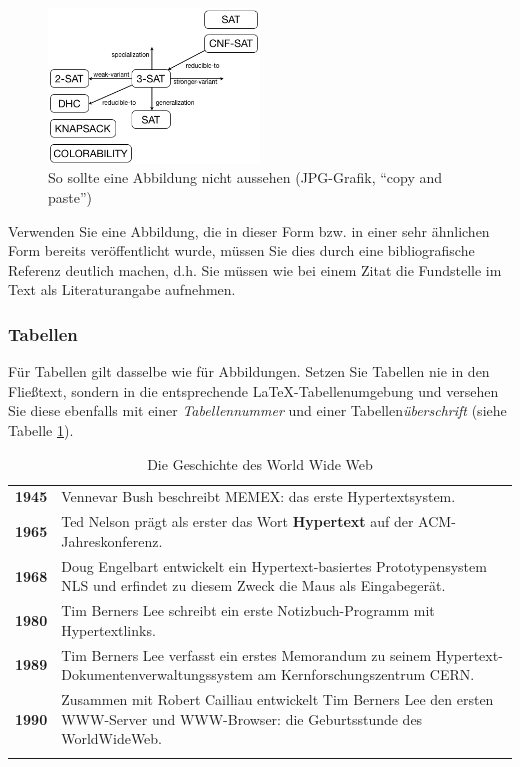 \begin{figure}[ht]
  \begin{center}\includegraphics[width=0.5\textwidth]{images/3sat.png}\end{center}
  \caption{So sollte eine Abbildung nicht aussehen (JPG-Grafik, "`copy and paste"')}
  \label{fig_Abb2}
\end{figure} 
Verwenden Sie eine Abbildung, die in dieser Form bzw. in einer sehr ähnlichen Form bereits veröffentlicht wurde, müssen Sie dies durch eine bibliografische Referenz deutlich machen, d.h. Sie müssen wie bei einem Zitat die Fundstelle im Text als Literaturangabe aufnehmen.



\subsubsection{Tabellen}
Für Tabellen gilt dasselbe wie für Abbildungen.
Setzen Sie Tabellen nie in den Fließtext, sondern in die entsprechende \LaTeX-Tabellenumgebung und versehen Sie diese ebenfalls mit einer {\em Tabellennummer} und einer Tabellen{\em überschrift} (siehe Tabelle \ref{tab_HistoryWWW}).

\begin{table}
\caption{Die Geschichte des World Wide Web}
\begin{tabular}{rp{12cm}} \noalign{\smallskip} \hline \noalign{\smallskip}
{\bf 1945} & Vennevar Bush\index{Bush, Vennevar} beschreibt MEMEX\index{MEMEX}: das erste Hypertextsystem.\\
{\bf 1965} & Ted Nelson\index{Nelson, Ted} prägt als erster das Wort {\bf Hypertext}\index{Hypertext} auf der ACM-Jahreskonferenz.\\ 
{\bf 1968} & Doug Engelbart\index{Englebart, Douglas C.} entwickelt ein Hypertext-basiertes Prototypensystem NLS und erfindet zu diesem Zweck die Maus als Eingabegerät.\\
{\bf 1980} & Tim Berners Lee\index{Lee, Tim Berners} schreibt ein erste Notizbuch-Programm mit Hypertextlinks.\\
{\bf 1989} & Tim Berners Lee verfasst ein erstes Memorandum zu seinem Hypertext-Dokumentenverwaltungssystem am Kernforschungszentrum CERN.\\
{\bf 1990} & Zusammen mit Robert Cailliau\index{Cailliau, Robert} entwickelt Tim Berners Lee den ersten WWW-Server\index{Server} und WWW-Browser\index{Browser}: die Geburtsstunde des WorldWideWeb.\\  \noalign{\smallskip} \hline
\end{tabular}
\label{tab_HistoryWWW}
\end{table}  

